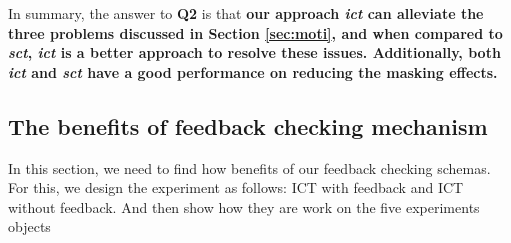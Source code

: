\documentclass[10pt,journal,compsoc]{IEEEtran}
\begin{document}


In summary, the answer to \textbf{Q2} is that \textbf{our approach \emph{ict} can alleviate the three problems discussed in Section \ref{sec:moti}, and when compared to \emph{sct}, \emph{ict} is a better approach to resolve these issues. Additionally, both \emph{ict} and \emph{sct} have a good performance on reducing the masking effects.}

{\color{blue}\subsection{The benefits of feedback checking mechanism}

In this section, we need to find how benefits of our feedback checking schemas. For this, we design the experiment as follows: ICT with feedback and ICT without feedback. And then show how they are work on the five experiments objects


}
\end{document}
